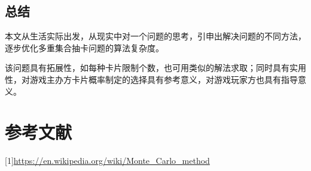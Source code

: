 \documentclass[master]{thesis-uestc}
\begin{document}
\section{总结}

本文从生活实际出发，从现实中对一个问题的思考，引申出解决问题的不同方法，逐步优化多重集合抽卡问题的算法复杂度。

该问题具有拓展性，如每种卡片限制个数，也可用类似的解法求取；同时具有实用性，对游戏主办方卡片概率制定的选择具有参考意义，对游戏玩家方也具有指导意义。

\chapter*{参考文献}

[1]\url{https://en.wikipedia.org/wiki/Monte_Carlo_method}
\end{document}

